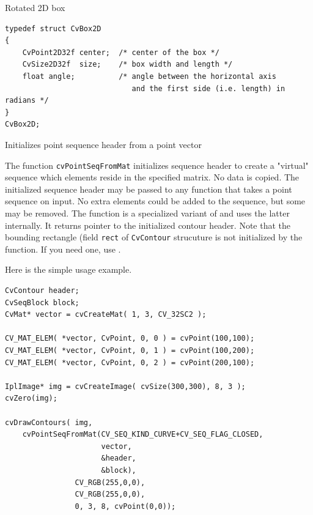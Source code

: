 \label{CvBox2D}

Rotated 2D box

\begin{lstlisting}
typedef struct CvBox2D
{
    CvPoint2D32f center;  /* center of the box */
    CvSize2D32f  size;    /* box width and length */
    float angle;          /* angle between the horizontal axis
                             and the first side (i.e. length) in radians */
}
CvBox2D;
\end{lstlisting}

\label{PointSeqFromMat}

Initializes point sequence header from a point vector


\begin{description}
\end{description}

The function \texttt{cvPointSeqFromMat} initializes sequence
header to create a "virtual" sequence which elements reside in
the specified matrix. No data is copied. The initialized sequence
header may be passed to any function that takes a point sequence
on input. No extra elements could be added to the sequence,
but some may be removed. The function is a specialized variant of
 and uses
the latter internally. It returns pointer to the initialized contour
header. Note that the bounding rectangle (field \texttt{rect} of
\texttt{CvContour} strucuture is not initialized by the function. If
you need one, use .

Here is the simple usage example.

\begin{lstlisting}
CvContour header;
CvSeqBlock block;
CvMat* vector = cvCreateMat( 1, 3, CV_32SC2 );

CV_MAT_ELEM( *vector, CvPoint, 0, 0 ) = cvPoint(100,100);
CV_MAT_ELEM( *vector, CvPoint, 0, 1 ) = cvPoint(100,200);
CV_MAT_ELEM( *vector, CvPoint, 0, 2 ) = cvPoint(200,100);

IplImage* img = cvCreateImage( cvSize(300,300), 8, 3 );
cvZero(img);

cvDrawContours( img,
    cvPointSeqFromMat(CV_SEQ_KIND_CURVE+CV_SEQ_FLAG_CLOSED,
                      vector,
                      &header,
                      &block),
                CV_RGB(255,0,0),
                CV_RGB(255,0,0),
                0, 3, 8, cvPoint(0,0));
\end{lstlisting}

